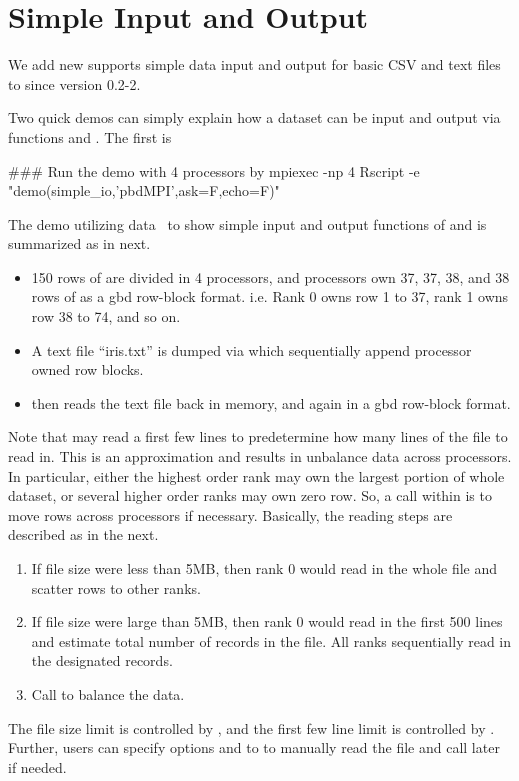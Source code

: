 
\section[Simple Input and Output]{Simple Input and Output}
\label{sec:simple_io}

We add new supports simple data input and output for basic CSV and text
files to  since version 0.2-2.

Two quick demos can simply explain how a dataset can be input and output
via  functions  and
. The first is
\begin{Command}
### Run the demo with 4 processors by
mpiexec -np 4 Rscript -e "demo(simple_io,'pbdMPI',ask=F,echo=F)"
\end{Command}
The demo utilizing  data~\citep{Fisher1936} to show simple input
and output functions of  and is summarized as in next.
\begin{itemize}
\item 150 rows of  are divided in 4 processors, and processors
      own 37, 37, 38, and 38 rows of  as a gbd row-block format.
      i.e. Rank 0 owns row 1 to 37, rank 1 owns row 38 to 74, and so on.
\item A text file ``iris.txt'' is dumped via  which
      sequentially append processor owned row blocks.
\item {} then reads the text file back in memory, and
      again in a gbd row-block format.
\end{itemize}

Note that  may read a first few lines to predetermine
how many lines of the file to read in. This is an approximation and results
in unbalance data across processors. In particular, either the highest order
rank may own the largest portion of whole dataset, or several higher order
ranks may own zero row. So, a call
 within 
is to move rows across processors if necessary.
Basically, the reading steps are described as in the next.
\begin{enumerate}
\item If file size were less than 5MB, then rank 0 would read in the whole file
      and scatter rows to other ranks.
\item If file size were large than 5MB, then rank 0 would read in the first
      500 lines and estimate total number of records in the file. All ranks
      sequentially read in the designated records.    
\item Call  to balance the data.
\end{enumerate}
The file size limit is controlled by ,
and the first few line limit is controlled by
.
Further, users can specify options  and  to
 to manually read the file and call
 later if needed.

